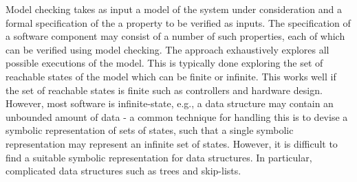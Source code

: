 Model checking takes as input a model of the system under
consideration and a formal specification of the a property to be verified as inputs. The specification of a software component may consist of a number of such properties, each of which can be verified using model checking. The approach exhaustively explores all possible executions of the model. This is typically done exploring the set of reachable states of the model  which can be finite or infinite. 
This works well if the set of reachable states is finite such as controllers and hardware design.  However, most software is infinite-state, e.g., a data structure may contain an unbounded amount of data - a common technique for handling this is to devise a symbolic representation of sets of states, such that a single symbolic representation may represent an infinite set of states. However, it is difficult to find a suitable symbolic representation for data structures. In particular, complicated data structures such as trees and skip-lists.


